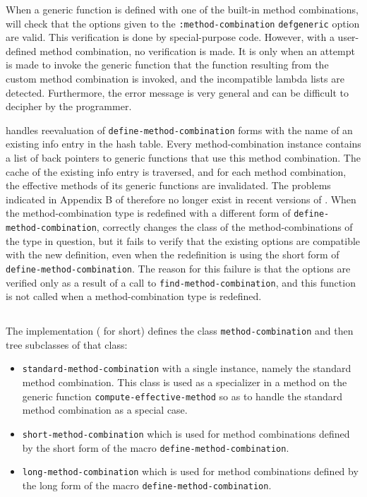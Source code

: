 When a generic function is defined with one of the built-in method
combinations, \sbcl{} will check that the options given to the
\texttt{:method-combination} \texttt{defgeneric} option are valid.
This verification is done by special-purpose code.  However, with a
user-defined method combination, no verification is made.  It is only
when an attempt is made to invoke the generic function that the
function resulting from the custom method combination is invoked, and
the incompatible lambda lists are detected.  Furthermore, the error
message is very general and can be difficult to decipher by the
programmer.

\sbcl{} handles reevaluation of \texttt{define-method-combination}
forms with the name of an existing info entry in the hash table.
Every method-combination instance contains a list of back pointers to
generic functions that use this method combination.  The cache of the
existing info entry is traversed, and for each method combination, the
effective methods of its generic functions are invalidated.
The problems indicated in Appendix B of \cite{verna.18.els} therefore
no longer exist in recent versions of \sbcl{}.  When the
method-combination type is redefined with a different form of
\texttt{define-method-combination}, \sbcl{} correctly changes the
class of the method-combinations of the type in question, but it fails
to verify that the existing options are compatible with the new
definition, even when the redefinition is using the short form of
\texttt{define-method-combination}.  The reason for this failure is
that the options are verified only as a result of a call to
\texttt{find-method-combination}, and this function is not called when
a method-combination type is redefined.

\subsection{\clcl{}}
\label{sec-ccl}

The \clcl{} implementation (\ccl{} for short) defines the class
\texttt{method-combination} and then tree subclasses of that class:

\begin{itemize}
\item \texttt{standard-method-combination} with a single instance,
  namely the standard method combination.  This class is used as a
  specializer in a method on the generic function
  \texttt{compute-effective-method} so as to handle the standard
  method combination as a special case.
\item \texttt{short-method-combination} which is used for method
  combinations defined by the short form of the macro
  \texttt{define-method-combination}.
\item \texttt{long-method-combination} which is used for method
  combinations defined by the long form of the macro
  \texttt{define-method-combination}.
\end{itemize}

